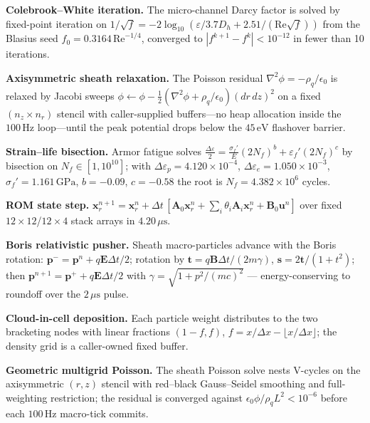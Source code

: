 \documentclass[10pt,journal,compsoc]{IEEEtran}
\newcommand{\mus}{\,\mu\mathrm{s}}
\begin{document}
\textbf{Colebrook--White iteration.} The micro-channel Darcy factor is
solved by fixed-point iteration on
$1/\sqrt{f} = -2\log_{10}(\varepsilon/3.7D_h + 2.51/(\mathrm{Re}\sqrt{f}))$
from the Blasius seed $f_0 = 0.3164\,\mathrm{Re}^{-1/4}$, converged to
$|f^{k+1}-f^k| < 10^{-12}$ in fewer than 10 iterations.

\textbf{Axisymmetric sheath relaxation.} The Poisson residual
$\nabla^2\phi = -\rho_q/\epsilon_0$ is relaxed by Jacobi sweeps
$\phi \leftarrow \phi - \tfrac{1}{2}(\nabla^2\phi +
\rho_q/\epsilon_0)(d r\,d z)^2$ on a fixed $(n_z \times n_r)$ stencil
with caller-supplied buffers---no heap allocation inside the $100\,
\mathrm{Hz}$ loop---until the peak potential drops below the $45\,
\mathrm{eV}$ flashover barrier.

\textbf{Strain--life bisection.} Armor fatigue solves
$\frac{\Delta\varepsilon}{2} =
\frac{\sigma_f'}{E}(2N_f)^b + \varepsilon_f'(2N_f)^c$
by bisection on $N_f \in [1, 10^{10}]$; with $\Delta\varepsilon_p =
4.120\times10^{-4}$, $\Delta\varepsilon_e = 1.050\times10^{-3}$,
$\sigma_f' = 1.161\,\mathrm{GPa}$, $b = -0.09$, $c = -0.58$ the root is
$N_f = 4.382\times10^{6}$ cycles.

\textbf{ROM state step.} $\mathbf{x}_r^{n+1} = \mathbf{x}_r^n +
\Delta t\,[\mathbf{A}_0\mathbf{x}_r^n + \textstyle\sum_i
\theta_i\mathbf{A}_i\mathbf{x}_r^n + \mathbf{B}_0\mathbf{u}^n]$ over
fixed $12\times12$/$12\times4$ stack arrays in $4.20\mus$.



\textbf{Boris relativistic pusher.} Sheath macro-particles advance
with the Boris rotation: $\mathbf{p}^{-} = \mathbf{p}^n +
q\mathbf{E}\Delta t/2$; rotation by
$\mathbf{t} = q\mathbf{B}\Delta t/(2m\gamma)$,
$\mathbf{s} = 2\mathbf{t}/(1+t^2)$; then $\mathbf{p}^{n+1} =
\mathbf{p}^{+} + q\mathbf{E}\Delta t/2$ with
$\gamma = \sqrt{1+p^2/(mc)^2}$ --- energy-conserving to roundoff over
the $2\,\mu\mathrm{s}$ pulse.

\textbf{Cloud-in-cell deposition.} Each particle weight distributes
to the two bracketing nodes with linear fractions $(1-f, f)$,
$f = x/\Delta x - \lfloor x/\Delta x\rfloor$; the density grid is a
caller-owned fixed buffer.

\textbf{Geometric multigrid Poisson.} The sheath Poisson solve
nests V-cycles on the axisymmetric $(r,z)$ stencil with
red--black Gauss--Seidel smoothing and full-weighting restriction;
the residual is converged against $\epsilon_0\phi/\rho_q L^2 <
10^{-6}$ before each $100\,\mathrm{Hz}$ macro-tick commits.
\end{document}
